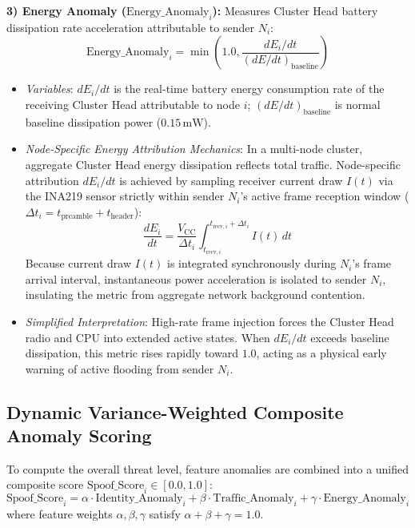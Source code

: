 \documentclass[conference]{IEEEtran}
\begin{document}
\textbf{3) Energy Anomaly ($\text{Energy\_Anomaly}_i$):} Measures Cluster Head battery dissipation rate acceleration attributable to sender $N_i$:
\begin{equation}
\label{eq_energy_anomaly}
\text{Energy\_Anomaly}_i = \min\left(1.0, \frac{dE_i/dt}{(dE/dt)_{\text{baseline}}}\right)
\end{equation}
\begin{itemize}
    \item \textit{Variables}: $dE_i/dt$ is the real-time battery energy consumption rate of the receiving Cluster Head attributable to node $i$; $(dE/dt)_{\text{baseline}}$ is normal baseline dissipation power ($0.15\,\text{mW}$).
    \item \textit{Node-Specific Energy Attribution Mechanics}: In a multi-node cluster, aggregate Cluster Head energy dissipation reflects total traffic. Node-specific attribution $dE_i/dt$ is achieved by sampling receiver current draw $I(t)$ via the INA219 sensor strictly within sender $N_i$'s active frame reception window ($\Delta t_i = t_{\text{preamble}} + t_{\text{header}}$):
    \begin{equation}
    \label{eq_node_energy_attribution}
        \frac{dE_i}{dt} = \frac{V_{\text{CC}}}{\Delta t_i} \int_{t_{\text{recv}, i}}^{t_{\text{recv}, i} + \Delta t_i} I(t) \, dt
    \end{equation}
    Because current draw $I(t)$ is integrated synchronously during $N_i$'s frame arrival interval, instantaneous power acceleration is isolated to sender $N_i$, insulating the metric from aggregate network background contention.
    \item \textit{Simplified Interpretation}: High-rate frame injection forces the Cluster Head radio and CPU into extended active states. When $dE_i/dt$ exceeds baseline dissipation, this metric rises rapidly toward $1.0$, acting as a physical early warning of active flooding from sender $N_i$.
\end{itemize}

\subsection{Dynamic Variance-Weighted Composite Anomaly Scoring}
To compute the overall threat level, feature anomalies are combined into a unified composite score $\text{Spoof\_Score}_i \in [0.0, 1.0]$:
\begin{equation}
\label{eq_spoof_score}
\text{Spoof\_Score}_i = \alpha \cdot \text{Identity\_Anomaly}_i + \beta \cdot \text{Traffic\_Anomaly}_i + \gamma \cdot \text{Energy\_Anomaly}_i
\end{equation}
where feature weights $\alpha, \beta, \gamma$ satisfy $\alpha + \beta + \gamma = 1.0$.
\end{document}
